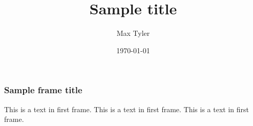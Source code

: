 \documentclass{beamer}
\title{Sample title}
\author{Max Tyler}
\institute{ShareLaTeX}
\date{\today}
\begin{document}
 
\frame{\titlepage}
 
\begin{frame}
\frametitle{Sample frame title}
This is a text in first frame. This is a text in first frame. This is a text in first frame.
\end{frame}
 
\end{document}
